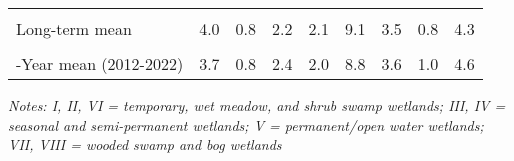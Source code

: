 \documentclass[
  12pt,
]{article}
\begin{document}
\begin{table}[!h]
{\begin{threeparttable}
\begin{tabular}[t]{>{\centering\arraybackslash}m{8em}cccccccc}
\cellcolor{gray!6}{\% Change from previous year} & \cellcolor{gray!6}{-98.3\%} & \cellcolor{gray!6}{-92.9\%} & \cellcolor{gray!6}{-78.6\%} & \cellcolor{gray!6}{-97.6\%} & \cellcolor{gray!6}{-91.6\%} & \cellcolor{gray!6}{-94.8\%} & \cellcolor{gray!6}{-95.4\%} & \cellcolor{gray!6}{-94.9\%}\\
Long-term mean & 4.0 & 0.8 & 2.2 & 2.1 & 9.1 & 3.5 & 0.8 & 4.3\\
\cellcolor{gray!6}{\% Change from long-term mean} & \cellcolor{gray!6}{-98.7\%} & \cellcolor{gray!6}{-89.7\%} & \cellcolor{gray!6}{-63.4\%} & \cellcolor{gray!6}{-94.6\%} & \cellcolor{gray!6}{-88.3\%} & \cellcolor{gray!6}{-92.6\%} & \cellcolor{gray!6}{-92.3\%} & \cellcolor{gray!6}{-92.5\%}\\
10-Year mean (2012-2022) & 3.7 & 0.8 & 2.4 & 2.0 & 8.8 & 3.6 & 1.0 & 4.6\\
\bottomrule
\end{tabular}
\begin{tablenotes}
\small
\item \textit{Notes: I, II, VI = temporary, wet meadow, and shrub swamp
    wetlands; III, IV = seasonal and semi-permanent wetlands; V =
    permanent/open water wetlands; VII, VIII = wooded swamp and bog wetlands} 
\item 
\end{tablenotes}
\end{threeparttable}}
\end{table}

\newpage
\end{document}

